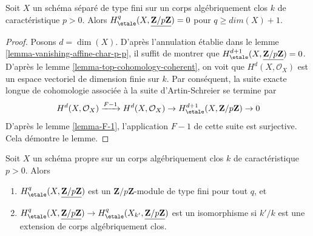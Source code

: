 \begin{lemma}
\label{lemma-vanishing-variety-char-p-p}
Soit $X$ un sch\'ema s\'epar\'e de type fini sur un corps alg\'ebriquement clos
$k$ de caract\'eristique $p > 0$. Alors
$H_\etale^q(X, \underline{\mathbf{Z}/p\mathbf{Z}}) = 0$ pour
$q \geq dim(X) + 1$.
\end{lemma}

\begin{proof}
Posons $d = \dim(X)$. D'apr\`es l'annulation \'etablie dans le
lemme \ref{lemma-vanishing-affine-char-p-p},
il suffit de montrer que
$H_\etale^{d + 1}(X, \underline{\mathbf{Z}/p\mathbf{Z}}) = 0$.
D'apr\`es le lemme \ref{lemma-top-cohomology-coherent}, on voit que
$H^d(X, \mathcal{O}_X)$ est un espace vectoriel de dimension finie sur $k$.
Par cons\'equent, la suite exacte longue de cohomologie associ\'ee \`a la
suite d'Artin-Schreier se termine par
$$
H^d(X, \mathcal{O}_X) \xrightarrow{F - 1}
H^d(X, \mathcal{O}_X) \to H^{d + 1}_\etale(X, \mathbf{Z}/p\mathbf{Z}) \to 0
$$
D'apr\`es le lemme \ref{lemma-F-1}, l'application $F - 1$ de cette suite est surjective.
Cela d\'emontre le lemme.
\end{proof}

\begin{lemma}
\label{lemma-finiteness-proper-variety-char-p-p}
Soit $X$ un sch\'ema propre sur un corps alg\'ebriquement clos
$k$ de caract\'eristique $p > 0$. Alors
\begin{enumerate}
\item $H_\etale^q(X, \underline{\mathbf{Z}/p\mathbf{Z}})$
est un $\mathbf{Z}/p\mathbf{Z}$-module de type fini pour tout $q$, et
\item $H^q_\etale(X, \underline{\mathbf{Z}/p\mathbf{Z}}) \to
H^q_\etale(X_{k'}, \underline{\mathbf{Z}/p\mathbf{Z}})$
est un isomorphisme si $k'/k$ est une extension de corps alg\'ebriquement
clos.
\end{enumerate}
\end{lemma}


